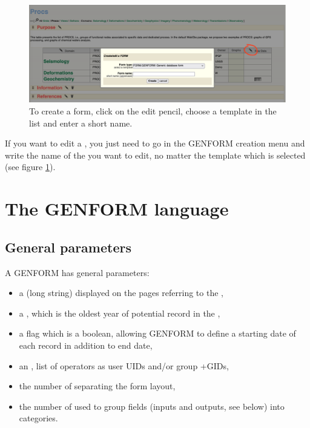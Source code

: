 \begin{figure}[!h]
	\centering
	\includegraphics[width=\textwidth]{figures/GENFORM_creation.png}
	\caption{To create a form, click on the edit pencil, choose a template in the list and enter a short name.}
	\label{GENFORM_creation}
\end{figure}

If you want to edit a , you just need to go in the GENFORM creation menu and write the name of the  you want to edit, no matter the template which is selected (see figure \ref{GENFORM_creation}).

\section{The GENFORM language}

\subsection{General parameters}

A GENFORM  has general parameters:
\begin{itemize}
	\item a  (long string) displayed on the pages referring to the ,
	\item a , which is the oldest year of potential record in the ,
	\item a  flag which is a boolean, allowing GENFORM to define a starting date of each record in addition to end date,
	\item an , list of operators as user UIDs and/or group +GIDs,
	\item the number of  separating the form layout,
	\item the number of  used to group fields (inputs and outputs, see below) into categories.
\end{itemize}

